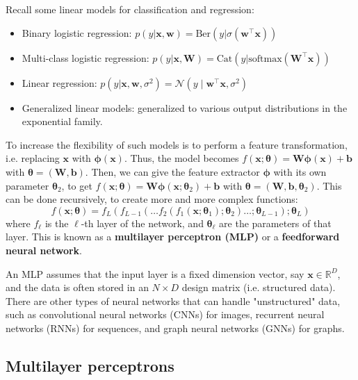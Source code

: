 \documentclass[11pt]{article}
\begin{document}
Recall some linear models for classification and regression:
\begin{itemize}
    \item Binary logistic regression: $p(y | \boldsymbol{x}, \boldsymbol{w}) = \text{Ber}(y | \sigma(\boldsymbol{w}^\top \boldsymbol{x}))$
    \item Multi-class logistic regression: $p(y | \boldsymbol{x}, \boldsymbol{W}) = \text{Cat}(y | \text{softmax}(\mathbf{W}^\top \boldsymbol{x}))$
    \item Linear regression: $p(y | \boldsymbol{x}, \boldsymbol{w}, \sigma^2) = \mathcal{N}(y \mid \boldsymbol{w}^\top \boldsymbol{x}, \sigma^2)$
    \item Generalized linear models: generalized to various output distributions in the exponential family.
\end{itemize}

To increase the flexibility of such models is to perform a feature transformation, i.e. replacing $\boldsymbol{x}$ with $\boldsymbol{\phi}(\boldsymbol{x})$.
Thus, the model becomes $f(\boldsymbol{x};\boldsymbol{\theta}) = \mathbf{W} \boldsymbol{\phi}(\boldsymbol{x}) + \boldsymbol{b}$ with $\boldsymbol{\theta} = (\mathbf{W}, \boldsymbol{b})$.
Then, we can give the feature extractor $\boldsymbol{\phi}$ with its own parameter $\boldsymbol{\theta}_2$, to get $f(\boldsymbol{x};\boldsymbol{\theta}) = \mathbf{W} \boldsymbol{\phi}(\boldsymbol{x};\boldsymbol{\theta}_2) + \boldsymbol{b}$ with $\boldsymbol{\theta} = (\mathbf{W}, \boldsymbol{b}, \boldsymbol{\theta}_2)$.
This can be done recursively, to create more and more complex functions:
\[
f(\boldsymbol{x};\boldsymbol{\theta}) = f_L(f_{L-1}(\ldots f_2(f_1(\boldsymbol{x};\boldsymbol{\theta}_1);\boldsymbol{\theta}_2)\ldots;\boldsymbol{\theta}_{L-1});\boldsymbol{\theta}_L)
\]
where $f_\ell$ is the $\ell$-th layer of the network, and $\boldsymbol{\theta}_\ell$ are the parameters of that layer. This is known as a \textbf{multilayer perceptron (MLP)} or a \textbf{feedforward neural network}.

An MLP assumes that the input layer is a fixed dimension vector, say $\boldsymbol{x} \in \mathbb{R}^D$, and the data is often stored in an $N \times D$ design matrix (i.e. structured data).
There are other types of neural networks that can handle "unstructured" data, such as convolutional neural networks (CNNs) for images, recurrent neural networks (RNNs) for sequences, and graph neural networks (GNNs) for graphs.

\subsection{Multilayer perceptrons}
\end{document}
